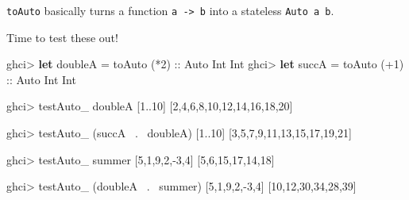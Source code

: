\documentclass[]{article}
\newenvironment{Shaded}{}{}
\newcommand{\KeywordTok}[1]{\textcolor[rgb]{0.00,0.44,0.13}{\textbf{{#1}}}}
\newcommand{\DataTypeTok}[1]{\textcolor[rgb]{0.56,0.13,0.00}{{#1}}}
\newcommand{\DecValTok}[1]{\textcolor[rgb]{0.25,0.63,0.44}{{#1}}}
\newcommand{\OtherTok}[1]{\textcolor[rgb]{0.00,0.44,0.13}{{#1}}}
\newcommand{\FunctionTok}[1]{\textcolor[rgb]{0.02,0.16,0.49}{{#1}}}
\newcommand{\NormalTok}[1]{{#1}}
\begin{document}
\texttt{toAuto} basically turns a function
\texttt{a\ -\textgreater{}\ b} into a stateless \texttt{Auto\ a\ b}.

Time to test these out!

\begin{Shaded}
\begin{Highlighting}[]
\NormalTok{ghci}\FunctionTok{>} \KeywordTok{let} \NormalTok{doubleA  }\FunctionTok{=} \NormalTok{toAuto (}\FunctionTok{*}\DecValTok{2}\NormalTok{)}\OtherTok{      ::} \DataTypeTok{Auto} \DataTypeTok{Int} \DataTypeTok{Int}
\NormalTok{ghci}\FunctionTok{>} \KeywordTok{let} \NormalTok{succA    }\FunctionTok{=} \NormalTok{toAuto (}\FunctionTok{+}\DecValTok{1}\NormalTok{)}\OtherTok{      ::} \DataTypeTok{Auto} \DataTypeTok{Int} \DataTypeTok{Int}

\NormalTok{ghci}\FunctionTok{>} \NormalTok{testAuto_ doubleA [}\DecValTok{1}\FunctionTok{..}\DecValTok{10}\NormalTok{]}
\NormalTok{[}\DecValTok{2}\NormalTok{,}\DecValTok{4}\NormalTok{,}\DecValTok{6}\NormalTok{,}\DecValTok{8}\NormalTok{,}\DecValTok{10}\NormalTok{,}\DecValTok{12}\NormalTok{,}\DecValTok{14}\NormalTok{,}\DecValTok{16}\NormalTok{,}\DecValTok{18}\NormalTok{,}\DecValTok{20}\NormalTok{]}

\NormalTok{ghci}\FunctionTok{>} \NormalTok{testAuto_ (succA }\FunctionTok{~.~} \NormalTok{doubleA) [}\DecValTok{1}\FunctionTok{..}\DecValTok{10}\NormalTok{]}
\NormalTok{[}\DecValTok{3}\NormalTok{,}\DecValTok{5}\NormalTok{,}\DecValTok{7}\NormalTok{,}\DecValTok{9}\NormalTok{,}\DecValTok{11}\NormalTok{,}\DecValTok{13}\NormalTok{,}\DecValTok{15}\NormalTok{,}\DecValTok{17}\NormalTok{,}\DecValTok{19}\NormalTok{,}\DecValTok{21}\NormalTok{]}

\NormalTok{ghci}\FunctionTok{>} \NormalTok{testAuto_ summer [}\DecValTok{5}\NormalTok{,}\DecValTok{1}\NormalTok{,}\DecValTok{9}\NormalTok{,}\DecValTok{2}\NormalTok{,}\FunctionTok{-}\DecValTok{3}\NormalTok{,}\DecValTok{4}\NormalTok{]}
\NormalTok{[}\DecValTok{5}\NormalTok{,}\DecValTok{6}\NormalTok{,}\DecValTok{15}\NormalTok{,}\DecValTok{17}\NormalTok{,}\DecValTok{14}\NormalTok{,}\DecValTok{18}\NormalTok{]}

\NormalTok{ghci}\FunctionTok{>} \NormalTok{testAuto_ (doubleA }\FunctionTok{~.~} \NormalTok{summer) [}\DecValTok{5}\NormalTok{,}\DecValTok{1}\NormalTok{,}\DecValTok{9}\NormalTok{,}\DecValTok{2}\NormalTok{,}\FunctionTok{-}\DecValTok{3}\NormalTok{,}\DecValTok{4}\NormalTok{]}
\NormalTok{[}\DecValTok{10}\NormalTok{,}\DecValTok{12}\NormalTok{,}\DecValTok{30}\NormalTok{,}\DecValTok{34}\NormalTok{,}\DecValTok{28}\NormalTok{,}\DecValTok{39}\NormalTok{]}


\end{Highlighting}
\end{Shaded}
\end{document}

